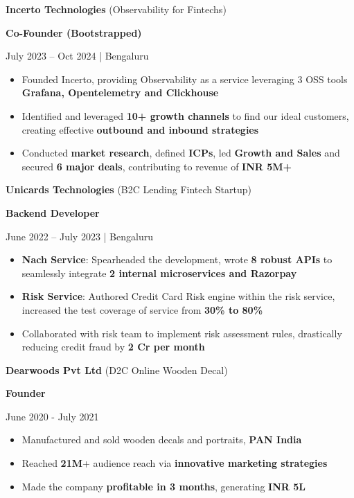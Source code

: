 \documentclass[10pt,a4paper]{article}
\newcommand{\cvevent}[4]{%
  {\large\color{emphasis}#1\par}
  \smallskip\normalsize
  \ifstrequal{#2}{}{}{
  \textbf{\color{accent}#2}\par
  \smallskip}
  \ifstrequal{#3}{}{}{#3}%
  \ifstrequal{#4}{}{}{ | #4}\par
  \medskip
}
\begin{document}
\cvevent{\textbf{Incerto Technologies} {\small (Observability for Fintechs)}}{Co-Founder (Bootstrapped)}{July 2023 -- Oct 2024}  {Bengaluru}
\begin{itemize}
\item Founded Incerto, providing Observability as a service leveraging 3 OSS tools \textbf{Grafana, Opentelemetry and Clickhouse}
\item Identified and leveraged \textbf{10+ growth channels} to find our ideal customers, creating effective \textbf{outbound and inbound strategies}
\item Conducted \textbf{market research}, defined \textbf{ICPs}, led \textbf{Growth and Sales} and secured \textbf{6 major deals}, contributing to revenue of \textbf{INR 5M+}
\end{itemize}

\cvevent{\textbf{Unicards Technologies} {\small (B2C Lending Fintech Startup)}}{Backend Developer}{June 2022 -- July 2023}  {Bengaluru}
\begin{itemize}
\item \textbf{Nach Service}: Spearheaded the development, wrote \textbf{8 robust APIs} to seamlessly integrate \textbf{2 internal microservices and Razorpay}
\item \textbf{Risk Service}: Authored Credit Card Risk engine within the risk service, increased the test coverage of service from \textbf{30\% to 80\%}
\item Collaborated with risk team to implement risk assessment rules,
drastically reducing credit fraud by \textbf{2 Cr per month}
\end{itemize}

\cvevent{\textbf{Dearwoods Pvt Ltd} {\small (D2C Online Wooden Decal)}}{Founder}{June 2020 - July 2021}{}
\begin{itemize}
\item Manufactured and sold wooden decals and portraits,\textbf{ PAN India}
\item Reached \textbf{21M}+ audience reach via \textbf{innovative marketing strategies}
\item Made the company \textbf{profitable in 3 months}, generating \textbf{INR 5L}
\end{itemize}
\end{document}
